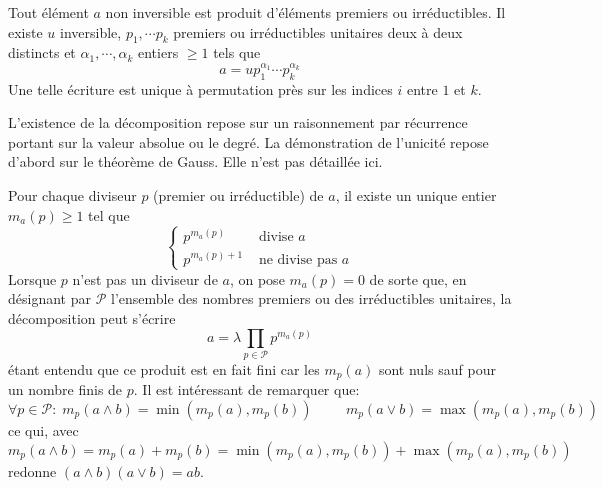 \begin{prop}
Tout élément $a$ non inversible est produit d'éléments premiers ou irréductibles. 
 Il existe  $u$ inversible, $p_1,\cdots p_k$ premiers ou irréductibles unitaires deux à deux distincts et $\alpha_1,\cdots,\alpha_k$ entiers $\geq 1$ tels que
\begin{displaymath}
 a = u p_1^{\alpha_1} \cdots p_k^{\alpha_k} 
\end{displaymath}
Une telle écriture est unique à permutation près sur les indices $i$ entre $1$ et $k$.
\end{prop}
\begin{demo}
 L'existence de la décomposition repose sur un raisonnement par récurrence portant sur la valeur absolue ou le degré. La démonstration de l'unicité repose d'abord sur le théorème de Gauss. Elle n'est pas détaillée ici.
\end{demo}
\begin{rem}
Pour chaque diviseur $p$ (premier ou irréductible) de $a$, il existe un unique entier $m_a(p)\geq 1$ tel que 
\begin{displaymath}\left\lbrace 
\begin{aligned}
 p^{m_a(p)} &\text{ divise } a\\
 p^{m_a(p)+1} &\text{ ne divise pas } a
\end{aligned}\right. 
\end{displaymath}
Lorsque $p$ n'est pas un diviseur de $a$, on pose $m_a(p)=0$ de sorte que, en désignant par $\mathcal P$ l'ensemble des nombres premiers ou des irréductibles unitaires, la décomposition peut s'écrire
\begin{displaymath}
 a=\lambda\prod_{p\in \mathcal P}p^{m_a(p)}
\end{displaymath}
étant entendu que ce produit est en fait fini car les $m_p(a)$ sont nuls sauf pour un nombre finis de $p$.\newline
Il est intéressant de remarquer que:
\begin{displaymath}
 \forall p\in \mathcal P :\; m_p(a\wedge b)=\min(m_p(a),m_p(b))\hspace{1cm}m_p(a\vee b)=\max(m_p(a),m_p(b))
\end{displaymath}
 ce qui, avec 
\begin{displaymath}
m_p(a\wedge b)=m_p(a)+m_p(b)= \min(m_p(a),m_p(b))+ \max(m_p(a),m_p(b))
\end{displaymath}
redonne $(a\wedge b)(a\vee b)=ab$.
\end{rem}
  
